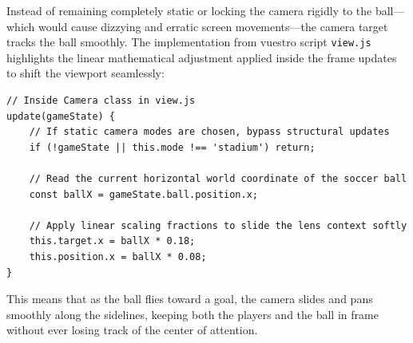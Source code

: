 Instead of remaining completely static or locking the camera rigidly to the ball—which would cause dizzying and erratic screen movements—the camera target tracks the ball smoothly. The implementation from vuestro script \texttt{view.js} highlights the linear mathematical adjustment applied inside the frame updates to shift the viewport seamlessly:

\begin{lstlisting}[style=vscode_JS]
// Inside Camera class in view.js
update(gameState) {
    // If static camera modes are chosen, bypass structural updates
    if (!gameState || this.mode !== 'stadium') return;
    
    // Read the current horizontal world coordinate of the soccer ball
    const ballX = gameState.ball.position.x;
    
    // Apply linear scaling fractions to slide the lens context softly
    this.target.x = ballX * 0.18;
    this.position.x = ballX * 0.08;
}
\end{lstlisting}

This means that as the ball flies toward a goal, the camera slides and pans smoothly along the sidelines, keeping both the players and the ball in frame without ever losing track of the center of attention.